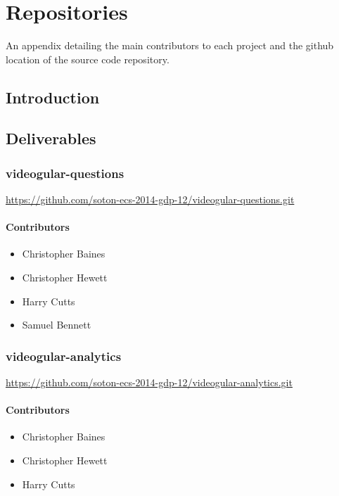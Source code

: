 \chapter{Repositories} \label{Chapter:Repositories}

An appendix detailing the main contributors to each project and the github location of the source code repository.

\begin{preamble}
\end{preamble}

\section{Introduction}

\section{Deliverables}

\subsection{videogular-questions}
\label{Section:Repo_videogular_questions}

\url{https://github.com/soton-ecs-2014-gdp-12/videogular-questions.git}

\subsubsection{Contributors}
\begin{itemize}
  \item Christopher Baines
  \item Christopher Hewett
  \item Harry Cutts
  \item Samuel Bennett
\end{itemize}

\subsection{videogular-analytics}
\label{Section:Repo_videogular_analytics}

\url{https://github.com/soton-ecs-2014-gdp-12/videogular-analytics.git}

\subsubsection{Contributors}
\begin{itemize}
  \item Christopher Baines
  \item Christopher Hewett
  \item Harry Cutts
\end{itemize}

